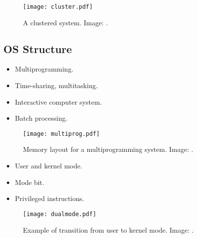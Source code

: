 \documentclass{beamer}
\begin{document}
\begin{frame}{\insertsubsectionhead}
  \begin{figure}
    \texttt{[image: cluster.pdf]}
    \caption{A clustered system.
      Image: \cite[p.\ 18]{Silberschatz2009osc}.
    }
  \end{figure}
\end{frame}

\subsection{OS Structure}

\begin{frame}{\insertsubsectionhead}
  \begin{itemize}
    \item Multiprogramming.
    \item Time-sharing, multitasking.
    \item Interactive computer system.
    \item Batch processing.
  \end{itemize}
\end{frame}

\begin{frame}{\insertsubsectionhead}
  \begin{figure}
    \texttt{[image: multiprog.pdf]}
    \caption{Memory layout for a multiprogramming system.
      Image: \cite[p.\ 19]{Silberschatz2009osc}.
    }
  \end{figure}
\end{frame}

\begin{frame}{\insertsubsectionhead}
  \begin{itemize}
    \item User and kernel mode.
    \item Mode bit.
    \item Privileged instructions.
  \end{itemize}
\end{frame}

\begin{frame}{\insertsubsectionhead}
  \begin{figure}
    \texttt{[image: dualmode.pdf]}
    \caption{Example of transition from user to kernel mode.
      Image: \cite[p.\ 21]{Silberschatz2009osc}.
    }
  \end{figure}
\end{frame}
\end{document}

